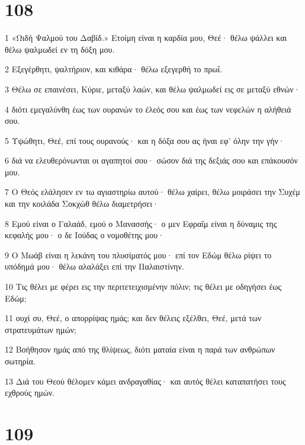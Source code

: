 \chapter{108}

\par 1 «Ωιδή Ψαλμού του Δαβίδ.» Ετοίμη είναι η καρδία μου, Θεέ· θέλω ψάλλει και θέλω ψαλμωδεί εν τη δόξη μου.
\par 2 Εξεγέρθητι, ψαλτήριον, και κιθάρα· θέλω εξεγερθή το πρωΐ.
\par 3 Θέλω σε επαινέσει, Κύριε, μεταξύ λαών, και θέλω ψαλμωδεί εις σε μεταξύ εθνών·
\par 4 διότι εμεγαλύνθη έως των ουρανών το έλεός σου και έως των νεφελών η αλήθειά σου.
\par 5 Υψώθητι, Θεέ, επί τους ουρανούς· και η δόξα σου ας ήναι εφ' όλην την γήν·
\par 6 διά να ελευθερόνωνται οι αγαπητοί σου· σώσον διά της δεξιάς σου και επάκουσόν μου.
\par 7 Ο Θεός ελάλησεν εν τω αγιαστηρίω αυτού· θέλω χαίρει, θέλω μοιράσει την Συχέμ και την κοιλάδα Σοκχώθ θέλω διαμετρήσει·
\par 8 Εμού είναι ο Γαλαάδ, εμού ο Μανασσής· ο μεν Εφραΐμ είναι η δύναμις της κεφαλής μου· ο δε Ιούδας ο νομοθέτης μου·
\par 9 Ο Μωάβ είναι η λεκάνη του πλυσίματός μου· επί τον Εδώμ θέλω ρίψει το υπόδημά μου· θέλω αλαλάξει επί την Παλαιστίνην.
\par 10 Τις θέλει με φέρει εις την περιτετειχισμένην πόλιν; τις θέλει με οδηγήσει έως Εδώμ;
\par 11 ουχί συ, Θεέ, ο απορρίψας ημάς; και δεν θέλεις εξέλθει, Θεέ, μετά των στρατευμάτων ημών;
\par 12 Βοήθησον ημάς από της θλίψεως, διότι ματαία είναι η παρά των ανθρώπων σωτηρία.
\par 13 Διά του Θεού θέλομεν κάμει ανδραγαθίας· και αυτός θέλει καταπατήσει τους εχθρούς ημών.

\chapter{109}

